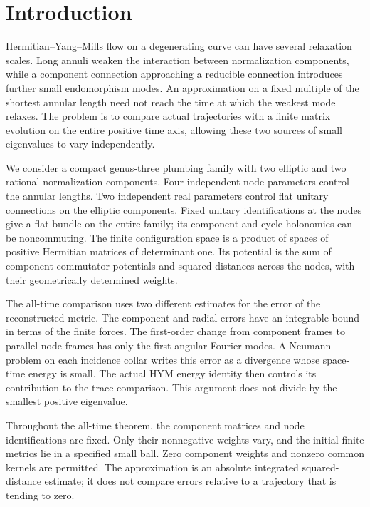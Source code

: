 \section{Introduction}\label{sec:introduction}

Hermitian--Yang--Mills flow on a degenerating curve can have several
relaxation scales. Long annuli weaken the interaction between normalization
components, while a component connection approaching a reducible connection
introduces further small endomorphism modes. An approximation on a fixed
multiple of the shortest annular length need not reach the time at which
the weakest mode relaxes. The problem is to compare actual trajectories
with a finite matrix evolution on the entire positive time axis, allowing
these two sources of small eigenvalues to vary independently.

We consider a compact genus-three plumbing family with two elliptic and
two rational normalization components. Four independent node parameters
control the annular lengths. Two independent real parameters control flat
unitary connections on the elliptic components. Fixed unitary identifications
at the nodes give a flat bundle on the entire family; its component and
cycle holonomies can be noncommuting. The finite configuration space is a
product of spaces of positive Hermitian matrices of determinant one. Its
potential is the sum of component commutator potentials and squared
distances across the nodes, with their geometrically determined weights.

The all-time comparison uses two different estimates for the error of the
reconstructed metric. The component and radial errors have an integrable
bound in terms of the finite forces. The first-order change from component
frames to parallel node frames has only the first angular Fourier modes.
A Neumann problem on each incidence collar writes this error as a
divergence whose space-time energy is small. The actual HYM energy identity
then controls its contribution to the trace comparison. This argument does
not divide by the smallest positive eigenvalue.

Throughout the all-time theorem, the component matrices and node
identifications are fixed. Only their nonnegative weights vary, and the
initial finite metrics lie in a specified small ball. Zero component
weights and nonzero common kernels are permitted. The approximation is an
absolute integrated squared-distance estimate; it does not compare errors
relative to a trajectory that is tending to zero.


